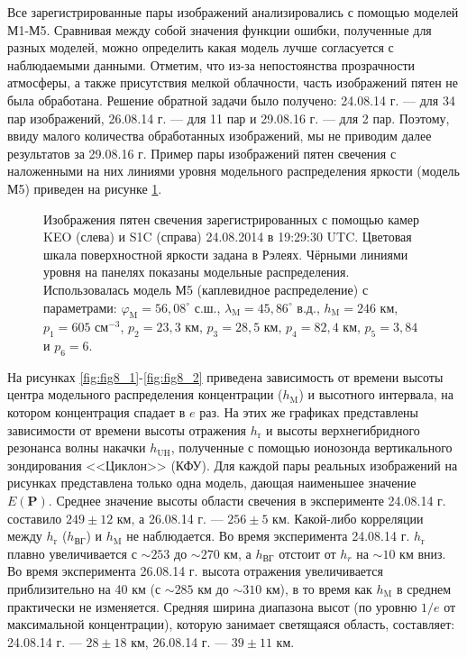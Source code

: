 \documentclass[12pt,a4paper]{article}
\renewcommand{\vec}{\mathbf}
\begin{document}
Все зарегистрированные пары изображений анализировались с помощью моделей М1-М5. Сравнивая между собой значения функции ошибки, полученные для разных моделей, можно определить какая модель лучше согласуется с наблюдаемыми данными. Отметим, что из-за непостоянства прозрачности атмосферы, а также присутствия мелкой облачности, часть изображений пятен не была обработана. Решение обратной задачи было получено: 24.08.14 г. --- для 34 пар изображений, 26.08.14 г. --- для 11 пар и 29.08.16 г. --- для 2 пар. Поэтому, ввиду малого количества обработанных изображений, мы не приводим далее результатов за 29.08.16 г. Пример пары изображений пятен свечения с наложенными на них линиями уровня модельного распределения яркости (модель М5) приведен на рисунке \ref{fig:fig7}.
\begin{figure}[h]
	\caption{Изображения пятен свечения зарегистрированных с помощью камер KEO (слева) и S1C (справа) 24.08.2014 в 19:29:30 UTC. Цветовая шкала поверхностной яркости задана в Рэлеях. Чёрными линиями уровня на панелях показаны модельные распределения. Использовалась модель М5 (каплевидное распределение) с параметрами: $\varphi_\text{M}=56,08^\circ$ с.ш., $\lambda_\text{M}=45,86^\circ$ в.д., $h_\text{M}=246$ км, $p_1=605$ см$^{-3}$, $p_2=23,3$ км, $p_3=28,5$ км, $p_4=82,4$ км, $p_5=3,84$ и $p_6=6$.}
	\label{fig:fig7}
\end{figure}
На рисунках \ref{fig:fig8_1}-\ref{fig:fig8_2} приведена зависимость от времени высоты центра модельного распределения концентрации ($h_\text{M}$) и высотного интервала, на котором концентрация спадает в $e$ раз. На этих же графиках представлены зависимости от времени высоты отражения $h_\text{r}$ и высоты верхнегибридного резонанса волны накачки $h_\text{UH}$, полученные с помощью ионозонда вертикального зондирования <<Циклон>> (КФУ). Для каждой пары реальных изображений на рисунках представлена только одна модель, дающая наименьшее значение $E(\vec{P})$. Среднее значение высоты области свечения в эксперименте 24.08.14 г. составило $249\pm12$ км, а 26.08.14 г. --- $256\pm5$ км. Какой-либо корреляции между $h_\text{r}$ ($h_\text{ВГ}$) и $h_\text{M}$ не наблюдается. Во время эксперимента 24.08.14 г. $h_\text{r}$ плавно увеличивается с $\sim253$ до $\sim270$ км, а $h_\text{ВГ}$ отстоит от $h_r$ на $\sim10$ км вниз.
Во время эксперимента 26.08.14 г. высота отражения увеличивается приблизительно на 40 км (с $\sim285$ км до $\sim310$ км), в то время как $h_\text{M}$ в среднем практически не изменяется. Средняя ширина диапазона высот (по уровню $1/e$ от максимальной концентрации), которую занимает светящаяся область, составляет: 24.08.14 г. --- $28\pm18$ км, 26.08.14 г. --- $39\pm 11$ км. 
\end{document}
